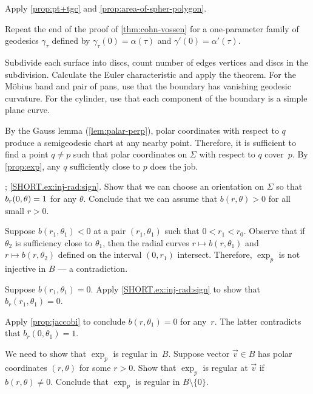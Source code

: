 \begin{multicols}{2}
Apply \ref{prop:pt+tgc} and \ref{prop:area-of-spher-polygon}.

Repeat the end of the proof of \ref{thm:cohn-vossen} for a one-parameter family of geodesics $\gamma_\tau$ defined by $\gamma_\tau(0)=\alpha(\tau)$ and $\gamma'(0)=\alpha'(\tau)$. 

Subdivide each surface into discs,
count number of edges vertices and discs in the subdivision.
Calculate the Euler characteristic and apply the theorem.
For the Möbius band and pair of pans, use that the boundary has vanishing geodesic curvature.
For the cylinder, use that each component of the boundary is a simple plane curve. 


\setcounter{eqtn}{0}

By the Gauss lemma (\ref{lem:palar-perp}), polar coordinates with respect to $q$ produce a semigeodesic chart at any nearby point.
Therefore, it is sufficient to find a point $q\ne p$ such that polar coordinates on $\Sigma$ with respect to $q$ cover~$p$.
By \ref{prop:exp}, any $q$ sufficiently close to $p$ does the job.

\parbf{\ref{ex:inj-rad}}; \ref{SHORT.ex:inj-rad:sign}.
Show that we can choose an orientation on $\Sigma$ so that $b_r(0,\theta)\z=1$ for any $\theta$.
Conclude that we can assume that $b(r,\theta)>0$ for all small $r>0$.

Suppose $b(r_1,\theta_1)<0$ at a pair $(r_1,\theta_1)$ such that $0<r_1<r_0$.
Observe that if $\theta_2$ is sufficiency close to $\theta_1$, then the radial curves $r\mapsto b(r,\theta_1)$ and $r\mapsto b(r,\theta_2)$ defined on the interval $(0,r_1)$ intersect.
Therefore, $\exp_p$ is not injective in $B$ --- a contradiction.

Suppose $b(r_1,\theta_1)=0$.
Apply \ref{SHORT.ex:inj-rad:sign} to show that $b_r(r_1,\theta_1)=0$.

Apply \ref{prop:jaccobi} to conclude $b(r,\theta_1)=0$ for any~$r$.
The latter contradicts that $b_r(0,\theta_1)=1$.

We need to show that $\exp_p$ is regular in~$B$.
Suppose vector $\vec v\in B$ has polar coordinates $(r,\theta)$ for some $r>0$.
Show that $\exp_p$ is regular at $\vec v$ if $b(r,\theta)\ne 0$.
Conclude that $\exp_p$ is regular in $B\setminus \{0\}$.


\end{multicols}
